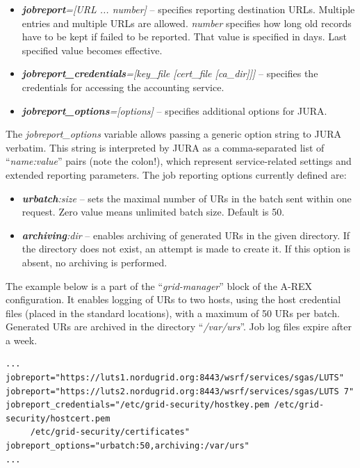 \documentclass{article}                            %
\begin{document}
\begin{itemize}
\item \textbf{\textit{jobreport}}\textit{={[}URL ... number]} --
  specifies reporting destination URLs. Multiple entries and multiple
  URLs are allowed. \textit{number} specifies how long old records
  have to be kept if failed to be reported. That value is specified in
  days. Last specified value becomes effective.
\item \textbf{\textit{jobreport\_credentials}}\textit{={[}key\_file
    {[}cert\_file {[}ca\_dir]]]} -- specifies the credentials for
  accessing the accounting service.
\item \textbf{\textit{jobreport\_options}}\textit{={[}options]}
  -- specifies additional options for JURA.
\end{itemize}

The \textit{jobreport\_options} variable allows passing a generic
option string to JURA verbatim. This string is interpreted by JURA as
a comma-separated list of ``\textit{name:value}'' pairs (note the
colon!), which represent service-related settings and extended
reporting parameters. The job reporting options currently defined are:

\begin{itemize}
\item \textbf{\textit{urbatch}}\textit{:size} -- sets the maximal
  number of URs in the batch sent within one request. Zero value means
  unlimited batch size. Default is 50.
\item \textbf{\textit{archiving}}\textit{:dir} -- enables archiving of
  generated URs in the given directory. If the directory does not
  exist, an attempt is made to create it. If this option is absent, no
  archiving is performed.
\end{itemize}

The example below is a part of the ``\textit{grid-manager}'' block of
the A-REX configuration. It enables logging of URs to two hosts, using
the host credential files (placed in the standard locations), with a
maximum of 50 URs per batch. Generated URs are archived in the
directory ``\textit{/var/urs}''.
Job log files expire after a week.
\begin{verbatim}
...
jobreport="https://luts1.nordugrid.org:8443/wsrf/services/sgas/LUTS"
jobreport="https://luts2.nordugrid.org:8443/wsrf/services/sgas/LUTS 7"
jobreport_credentials="/etc/grid-security/hostkey.pem /etc/grid-security/hostcert.pem 
     /etc/grid-security/certificates"
jobreport_options="urbatch:50,archiving:/var/urs"
...
\end{verbatim}
\end{document}
